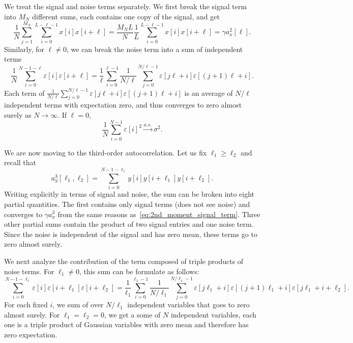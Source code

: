 \documentclass[english,11pt]{article}
\newcommand{\TODO}[1]{{\color{red}{[#1]}}}
\numberwithin{equation}{section}
\theoremstyle{plain}
\theoremstyle{definition}
\theoremstyle{remark}
\theoremstyle{plain}
\theoremstyle{remark}
\theoremstyle{plain}
\theoremstyle{plain}
\begin{document}
We treat the signal and noise terms separately. We first break the signal term into $M_N$ different sums, each contains one copy of the signal, and get
\begin{equation} \label{eq:2nd_moment_signal_term}
\frac{1}{N}\sum_{j=1}^{M_N}\sum_{i=0}^{L-\ell-1}x[i]x[i+\ell] = \frac{M_NL}{N}\frac{1}{L}\sum_{i=0}^{L-\ell-1}x[i]x[i+\ell] = \gamma a_x^2[\ell].
\end{equation}
Similarly, for $\ell\neq 0$, we can break the noise term into a sum of independent terms  \TODO{to recheck indicies}
\begin{equation}
\frac{1}{N}\sum_{i=0}^{N-1-\ell} \varepsilon[i]\varepsilon[i+\ell] = \frac{1}{\ell}\sum_{i=0}^{\ell-1}\frac{1}{N/\ell}\sum_{j=0}^{N/\ell -1} \varepsilon[j\ell + i] \varepsilon[(j+1)\ell + i].
\end{equation}
Each term of $\frac{1}{N/\ell}\sum_{j=0}^{N/\ell -1} \varepsilon[j\ell + i] \varepsilon[(j+1)\ell + i]$ is an average of $N/\ell$ independent terms with expectation zero, and thus converges to zero almost surely as $N\to\infty$.
If $\ell=0$, 
\begin{equation}
\frac{1}{N}\sum_{i=0}^{N-1} \varepsilon[i]^2 \xrightarrow{a.s.} \sigma^2.
\end{equation}

We are now moving to the third-order autocorrelation. Let us fix $\ell_1\geq\ell_2$ and recall that 
\begin{equation*}
a_y^3[\ell_1,\ell_2] = \sum_{i=0}^{N-1-\ell_1} y[i]y[i+\ell_1]y[i+\ell_2]. 
\end{equation*}
Writing explicitly in terms of signal and noise, the sum can be broken into eight partial quantities. The first contains only signal terms (does not see noise) and converges to $\gamma a_x^3$ from the same reasons as~\eqref{eq:2nd_moment_signal_term}. Three other partial sums contain the product of two signal entries and one noise term. Since the noise is independent of the signal and has zero mean, these terms go to zero almost surely.

We next analyze the contribution of the term composed of triple products of noise terms. For $\ell_1\neq 0$, this sum can be formulate as follows:
\begin{equation*}
\sum_{i=0}^{N-1-\ell_1} \varepsilon[i]\varepsilon[i+\ell_1]\varepsilon[i+\ell_2] = \frac{1}{\ell_1}\sum_{i=0}^{\ell_1-1}\frac{1}{N/\ell_1}\sum_{j=0}^{N/\ell_1 -1 }\varepsilon[j\ell_1+i]\varepsilon[(j+1)\ell_1+i]\varepsilon[j\ell_1+i+\ell_2].
\end{equation*}
For each fixed $i$, we sum of over $N/\ell_1$ independent variables that goes to zero almost surely. For $\ell_1=\ell_2=0$, we get a some of $N$ independent variables, each one is a triple product of Gaussian variables with zero mean and therefore has zero expectation. 
\end{document}
